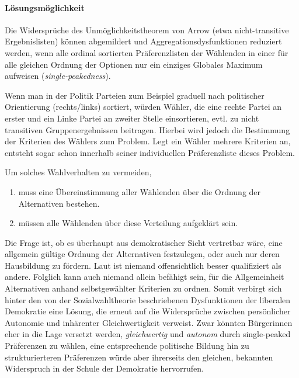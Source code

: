 \paragraph{Lösungsmöglichkeit}

Die Widersprüche des Unmöglichkeitstheorem von Arrow (etwa nicht-transitive Ergebnislisten) können abgemildert und Aggregationsdysfunktionen reduziert werden, wenn alle ordinal sortierten Präferenzlisten der Wählenden in einer für alle gleichen Ordnung der Optionen nur ein einziges Globales Maximum aufweisen (\emph{single-peakedness}).

Wenn man in der Politik Parteien zum Beispiel graduell nach politischer Orientierung (rechts/links) sortiert, würden Wähler, die eine rechte Partei an erster und ein Linke Partei an zweiter Stelle einsortieren, evtl. zu nicht transitiven Gruppenergebnissen beitragen.
Hierbei wird jedoch die Bestimmung der Kriterien des Wählers zum Problem.
Legt ein Wähler mehrere Kriterien an, entsteht sogar schon innerhalb seiner individuellen Präferenzliste dieses Problem.

Um solches Wahlverhalten zu vermeiden,

\begin{enumerate}
	\item muss eine Übereinstimmung aller Wählenden über die Ordnung der Alternativen bestehen.

	\item müssen alle Wählenden über diese Verteilung aufgeklärt sein.
\end{enumerate}

Die Frage ist, ob es überhaupt aus demokratischer Sicht vertretbar wäre, eine allgemein gültige Ordnung der Alternativen festzulegen, oder auch nur deren Hausbildung zu fördern.
Laut \citeauthor{Dahl-1989-aa} ist niemand offensichtlich besser qualifiziert als andere.
Folglich kann auch niemand allein befähigt sein, für die Allgemeinheit Alternativen anhand selbstgewählter Kriterien zu ordnen.
Somit verbirgt sich hinter den von der Sozialwahltheorie beschriebenen Dysfunktionen der liberalen Demokratie eine Lösung, die erneut auf die Widersprüche zwischen persönlicher Autonomie und inhärenter Gleichwertigkeit verweist.
Zwar könnten Bürgerinnen eher in die Lage versetzt werden, \emph{gleichwertig} und \emph{autonom} durch single-peaked Präferenzen zu wählen, eine entsprechende politische Bildung hin zu strukturierteren Präferenzen würde aber ihrerseits den gleichen, bekannten Widerspruch in der Schule der Demokratie hervorrufen.
